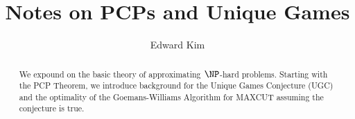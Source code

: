 \documentclass{amsart}
\theoremstyle{definition}
\theoremstyle{remark}
\numberwithin{equation}{section}
\theoremstyle{remark}
\begin{document}
\renewcommand{\phi}{\varphi}

\title{Notes on PCPs and Unique Games}

\author{Edward Kim}

\begin{abstract}
We expound on the basic theory of approximating $\NP$-hard problems. Starting with the PCP Theorem, we introduce background for the Unique Games Conjecture (UGC) and the optimality of the Goemans-Williams Algorithm for MAXCUT assuming the conjecture is true.
\end{abstract}

\maketitle






%








\end{document}
